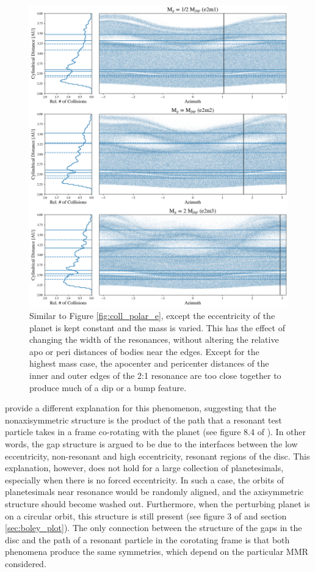 \begin{figure}
    \includegraphics[width=\textwidth]{figures/grind/coll_polar_m.png}
    \caption{Similar to Figure \ref{fig:coll_polar_e}, except the eccentricity of the planet is kept constant and the mass is varied.
    This has the effect of changing the width of the resonances, without altering the relative apo or peri distances of bodies near 
    the edges. Except for the highest mass case, the apocenter and pericenter distances of the inner and outer edges of the 2:1 
    resonance are too close together to produce much of a dip or a bump feature.\label{fig:coll_polar_m}}
\end{figure}

\cite{tabeshian16} provide a different explanation for this phenomenon, suggesting that the nonaxisymmetric structure is the 
product of the path that a resonant test particle takes in a frame co-rotating with the planet (see figure 8.4 of \cite{murray99}). In 
other words, the gap structure is argued to be due to the interfaces between the low eccentricity, non-resonant and high 
eccentricity, resonant regions of the disc. This explanation, however, does not hold for a large collection of planetesimals, 
especially when there is no forced eccentricity. In such a case, the orbits of planetesimals near resonance would be randomly 
aligned, and the axisymmetric structure should become washed out. Furthermore, when the perturbing planet is on a circular 
orbit, this structure is still present (see figure 3 of \cite{tabeshian16} and section \ref{sec:boley_plot}). The only connection 
between the structure of the gaps in the disc and the path of a resonant particle in the corotating frame is that both phenomena 
produce the same symmetries, which depend on the particular MMR considered.


